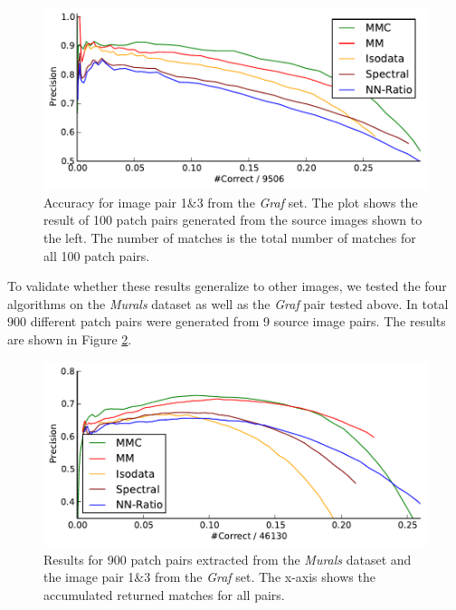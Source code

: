 \documentclass{article}
\begin{document}
\begin{figure}[htb]
			\centering
			\includegraphics[width=0.6\columnwidth]{images/result_graf}
	\caption{Accuracy for image pair 1\&3 from the \emph{Graf} set. The plot 
		shows the result of 100 patch pairs generated from the source 
		images shown to the left. The number of matches is the total 
		number of matches for all 100 patch pairs.}
	\label{fig:result_graf}
\end{figure}

To validate whether these results 
generalize to other images, we tested the four algorithms on the 
\emph{Murals} dataset as well as the \emph{Graf} pair tested above.  
In total 900 different patch pairs were generated from 9 
source image pairs.  The results are shown in Figure 
\ref{fig:result_accumulated}. 

\begin{figure}[htb]
	\centering
	\includegraphics[width=\columnwidth]{images/result_accumulated}
	\caption{Results for 900 patch pairs extracted from the \emph{Murals} dataset and the image pair 1\&3 from the \emph{Graf} set.  The x-axis shows the accumulated returned matches for all pairs.}
	\label{fig:result_accumulated}
\end{figure}
\end{document}
